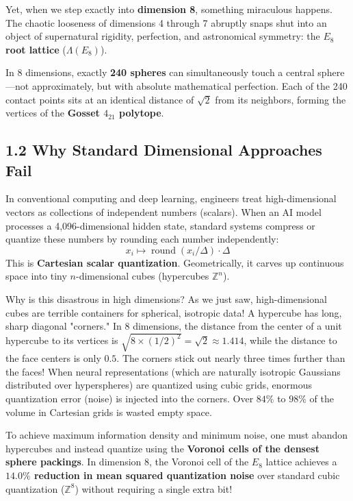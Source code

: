 \documentclass[11pt,twoside,openright]{amsbook}
\begin{document}
Yet, when we step exactly into \textbf{dimension 8}, something miraculous happens. The chaotic looseness of dimensions 4 through 7 abruptly snaps shut into an object of supernatural rigidity, perfection, and astronomical symmetry: the \textbf{$E_8$ root lattice} ($\Lambda(E_8)$).

In 8 dimensions, exactly \textbf{240 spheres} can simultaneously touch a central sphere—not approximately, but with absolute mathematical perfection. Each of the 240 contact points sits at an identical distance of $\sqrt{2}$ from its neighbors, forming the vertices of the \textbf{Gosset $4_{21}$ polytope}.

\subsection{1.2 Why Standard Dimensional Approaches Fail}

In conventional computing and deep learning, engineers treat high-dimensional vectors as collections of independent numbers (scalars). When an AI model processes a 4,096-dimensional hidden state, standard systems compress or quantize these numbers by rounding each number independently:
$$x_i \mapsto \operatorname{round}(x_i / \Delta) \cdot \Delta$$
This is \textbf{Cartesian scalar quantization}. Geometrically, it carves up continuous space into tiny $n$-dimensional cubes (hypercubes $\mathbb{Z}^n$).

Why is this disastrous in high dimensions?
As we just saw, high-dimensional cubes are terrible containers for spherical, isotropic data! A hypercube has long, sharp diagonal "corners." In 8 dimensions, the distance from the center of a unit hypercube to its vertices is $\sqrt{8 \times (1/2)^2} = \sqrt{2} \approx 1.414$, while the distance to the face centers is only $0.5$. The corners stick out nearly three times further than the faces!
When neural representations (which are naturally isotropic Gaussians distributed over hyperspheres) are quantized using cubic grids, enormous quantization error (noise) is injected into the corners. Over $84\%$ to $98\%$ of the volume in Cartesian grids is wasted empty space.

To achieve maximum information density and minimum noise, one must abandon hypercubes and instead quantize using the \textbf{Voronoi cells of the densest sphere packings}.
In dimension 8, the Voronoi cell of the $E_8$ lattice achieves a \textbf{$14.0\%$ reduction in mean squared quantization noise} over standard cubic quantization ($\mathbb{Z}^8$) without requiring a single extra bit!
\end{document}
